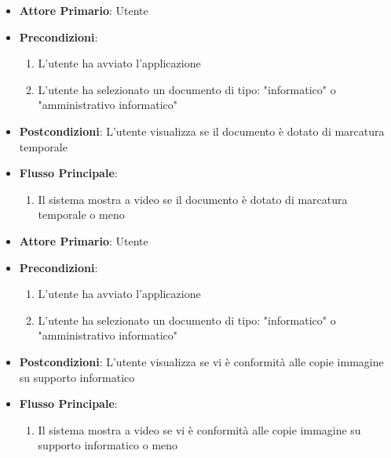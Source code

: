 \begin{itemize}
    \item \textbf{Attore Primario}: Utente
    \item \textbf{Precondizioni}:
    \begin{enumerate}
        \item L'utente ha avviato l'applicazione
        \item L'utente ha selezionato un documento di tipo: "informatico" o "amministrativo informatico"
    \end{enumerate}
    \item \textbf{Postcondizioni}: L'utente visualizza se il documento è dotato di marcatura temporale
    \item \textbf{Flusso Principale}:
        \begin{enumerate} 
        \item Il sistema mostra a video se il documento è dotato di marcatura temporale o meno
    \end{enumerate}
\end{itemize}

\begin{itemize}
    \item \textbf{Attore Primario}: Utente
    \item \textbf{Precondizioni}:
    \begin{enumerate}
        \item L'utente ha avviato l'applicazione
        \item L'utente ha selezionato un documento di tipo: "informatico" o "amministrativo informatico"
    \end{enumerate}
    \item \textbf{Postcondizioni}: L'utente visualizza se vi è conformità alle copie immagine su supporto informatico
    \item \textbf{Flusso Principale}:
        \begin{enumerate} 
        \item Il sistema mostra a video se vi è conformità alle copie immagine su supporto informatico o meno
    \end{enumerate}
\end{itemize}

